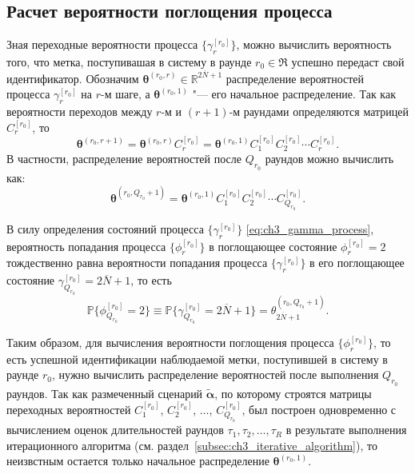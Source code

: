 \subsection{Расчет вероятности поглощения процесса}
Зная переходные вероятности процесса $\{ \gamma_r^{[r_0]} \}$, можно вычислить вероятность того, что метка, поступивашая в систему в раунде $r_0 \in \mathfrak{R}$ успешно передаст свой идентификатор. Обозначим $\bm{\theta}^{(r_0,r)} \in \mathbb{R}^{2\overline{N}+1}$ распределение вероятностей процесса $\gamma_r^{[r_0]}$ на $r$-м шаге, а $\bm{\theta}^{(r_0,1)}$ "--- его начальное распределение. Так как вероятности переходов между $r$-м и $(r+1)$-м раундами определяются матрицей $C_r^{[r_0]}$, то
$$
\bm{\theta}^{(r_0,r+1)} = \bm{\theta}^{(r_0,r)} C_{r}^{[r_0]} = \bm{\theta}^{(r_0,1)} C_1^{[r_0]} C_2^{[r_0]} \cdots C_r^{[r_0]}.
$$
В частности, распределение вероятностей после $Q_{r_0}$ раундов можно вычислить как:
$$
\bm{\theta}^{(r_0, Q_{r_0} + 1)} = \bm{\theta}^{(r_0, 1)} C^{[r_0]}_1 C^{[r_0]}_2 \cdots C^{[r_0]}_{Q_{r_0}}.
$$

В силу определения состояний процесса $\{ \gamma_r^{[r_0]} \}$ \eqref{eq:ch3_gamma_process}, вероятность попадания процесса $\{ \phi_r^{[r_0]} \}$ в поглощающее состояние $\phi_r^{[r_0]} = 2$ тождественно равна вероятности попадания процесса $\{ \gamma_r^{[r_0]} \}$ в его поглощающее состояние $\gamma_{Q_{r_0}}^{[r_0]} = 2\overline{N}+1$, то есть
$$
	\mathbb{P}\{ \phi_{Q_{r_0}}^{[r_0]} = 2 \} \equiv \mathbb{P}\{ \gamma_{Q_{r_0}}^{[r_0]} = 2\overline{N}+1 \} = \theta_{2\overline{N}+1}^{(r_0, Q_{r_0}+1)}.
$$

Таким образом, для вычисления вероятности поглощения процесса $\{ \phi_r^{[r_0]} \}$, то есть успешной идентификации наблюдаемой метки, поступившей в систему в раунде $r_0$, нужно вычислить распределение вероятностей после выполнения $Q_{r_0}$ раундов. Так как размеченный сценарий $\widetilde{\bm{\alpha}}$, по которому строятся матрицы переходных вероятностей $C^{[r_0]}_1$, $C^{[r_0]}_2$, $\dots$, $C^{[r_0]}_{Q_{r_0}}$, был построен одновременно с вычислением оценок длительностей раундов $\tau_1, \tau_2, \dots, \tau_R$ в результате выполнения итерационного алгоритма (см. раздел~\ref{subsec:ch3_iterative_algorithm}), то неизвстным остается только начальное распределение $\bm{\theta}^{(r_0, 1)}$.

